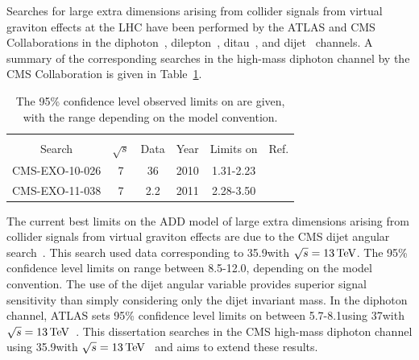 Searches for large extra dimensions arising from collider signals from virtual graviton effects at the LHC have been performed by the ATLAS and CMS Collaborations in the diphoton~\cite{Aaboud:2017yyg,Sirunyan:2018wnk}, dilepton~\cite{Aad:2014wca,Khachatryan:2014fba}, ditau~\cite{CMS-PAS-EXO-12-046}, and dijet~\cite{Sirunyan:2018wcm} channels. A summary of the corresponding searches in the high-mass diphoton channel by the CMS Collaboration is given in Table~\ref{tab:CMS_ADD_limits}.

\begin{table}[!htb]
	\centering
	\caption{ The 95\% confidence level observed limits on \Ms are given, with the range depending on the model convention.}
	\vspace{\baselineskip}
	\begin{tabular}{cccccc}
	\hline \hline
	\vspace*{-4.5mm} & & & & & \\
	Search       & $\sqrt{s}$ & Data & Year & Limits on \Ms & Ref. \\
	\hline
	CMS-EXO-10-026 & 7\TeV & 36\pbinv & 2010 & 1.31-2.23\TeV & \cite{Chatrchyan:2011jx} \\
	CMS-EXO-11-038 & 7\TeV & 2.2\fbinv & 2011 & 2.28-3.50\TeV & \cite{Chatrchyan:2011fq} \\
	\hline \hline
	\end{tabular}
	\label{tab:CMS_ADD_limits}
\end{table}

The current best limits on the ADD model of large extra dimensions arising from collider signals from virtual graviton effects are due to the CMS dijet angular search~\cite{Sirunyan:2018wcm}. This search used data corresponding to 35.9\fbinv with $\sqrt{s} = 13\,\text{Te\hspace{-.08em}V}$. The 95\% confidence level limits on \Ms range between 8.5-12.0\TeV, depending on the model convention. The use of the dijet angular variable provides superior signal sensitivity than simply considering only the dijet invariant mass. In the diphoton channel, ATLAS sets 95\% confidence level limits on \Ms between 5.7-8.1\TeV using 37\fbinv with $\sqrt{s} = 13\,\text{Te\hspace{-.08em}V}$~\cite{Aaboud:2017yyg}. This dissertation searches in the CMS high-mass diphoton channel using 35.9\fbinv with $\sqrt{s} = 13\,\text{Te\hspace{-.08em}V}$~\cite{Sirunyan:2018wnk} and aims to extend these results.


